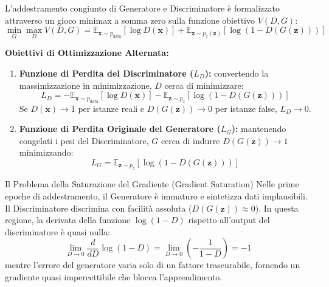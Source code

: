 \begin{definition}
L'addestramento congiunto di Generatore e Discriminatore è formalizzato attraverso un gioco minimax a somma zero sulla funzione obiettivo $V(D, G)$:
\begin{equation}
    \min_{G} \max_{D} V(D, G) = \mathbb{E}_{\mathbf{x} \sim p_{\text{data}}}[\log D(\mathbf{x})] + \mathbb{E}_{\mathbf{z} \sim p_z(\mathbf{z})}[\log(1 - D(G(\mathbf{z})))]
\end{equation}
\end{definition}

\textbf{Obiettivi di Ottimizzazione Alternata:}
\begin{enumerate}
    \item \textbf{Funzione di Perdita del Discriminatore ($L_D$):} convertendo la massimizzazione in minimizzazione, $D$ cerca di minimizzare:
    \begin{equation}
        L_D = -\mathbb{E}_{\mathbf{x} \sim p_{\text{data}}}[\log D(\mathbf{x})] - \mathbb{E}_{\mathbf{z} \sim p_z}[\log(1 - D(G(\mathbf{z})))]
    \end{equation}
    Se $D(\mathbf{x}) \to 1$ per istanze reali e $D(G(\mathbf{z})) \to 0$ per istanze false, $L_D \to 0$.
    \item \textbf{Funzione di Perdita Originale del Generatore ($L_G$):} mantenendo congelati i pesi del Discriminatore, $G$ cerca di indurre $D(G(\mathbf{z})) \to 1$ minimizzando:
    \begin{equation}
        L_G = \mathbb{E}_{\mathbf{z} \sim p_z}[\log(1 - D(G(\mathbf{z})))]
    \end{equation}
\end{enumerate}

\begin{alertblock}{Il Problema della Saturazione del Gradiente (Gradient Saturation)}
Nelle prime epoche di addestramento, il Generatore è immaturo e sintetizza dati implausibili. Il Discriminatore discrimina con facilità assoluta ($D(G(\mathbf{z})) \approx 0$). In questa regione, la derivata della funzione $\log(1 - D)$ rispetto all'output del discriminatore è quasi nulla:
\begin{equation}
    \lim_{D \to 0} \frac{d}{d D} \log(1 - D) = \lim_{D \to 0} \left( -\frac{1}{1 - D} \right) = -1
\end{equation}
mentre l'errore del generatore varia solo di un fattore trascurabile, fornendo un gradiente quasi impercettibile che blocca l'apprendimento.
\end{alertblock}

